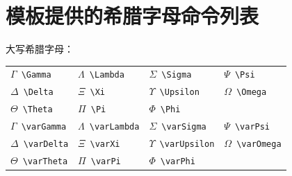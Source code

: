 \chapter{模板提供的希腊字母命令列表}

大写希腊字母：
\begin{table}[htbp]
\centering
\begin{tabular}{llll}
\toprule
$\Gamma$~\verb|\Gamma| & $\Lambda$~\verb|\Lambda| & $\Sigma$~\verb|\Sigma| & $\Psi$~\verb|\Psi| \\
$\Delta$~\verb|\Delta| & $\Xi$~\verb|\Xi| & $\Upsilon$~\verb|\Upsilon| & $\Omega$~\verb|\Omega| \\
$\Theta$~\verb|\Theta| & $\Pi$~\verb|\Pi| & $\Phi$~\verb|\Phi| & \\
\midrule
$\varGamma$~\verb|\varGamma| & $\varLambda$~\verb|\varLambda| & $\varSigma$~\verb|\varSigma| & $\varPsi$~\verb|\varPsi| \\
$\varDelta$~\verb|\varDelta| & $\varXi$~\verb|\varXi| & $\varUpsilon$~\verb|\varUpsilon| & $\varOmega$~\verb|\varOmega| \\
$\varTheta$~\verb|\varTheta| & $\varPi$~\verb|\varPi| & $\varPhi$~\verb|\varPhi| & \\
\bottomrule
\end{tabular}
\end{table}


